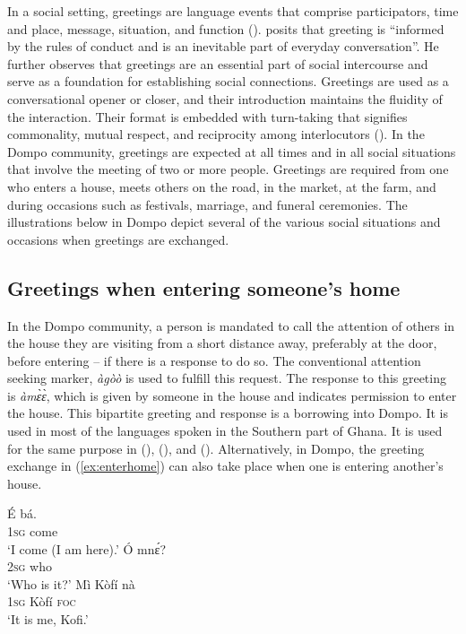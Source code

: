 \documentclass[output=paper,colorlinks,citecolor=brown]{langscibook}
\begin{document}
In a social setting, greetings are language events that comprise participators, time and place, message, situation, and function (\cite[14]{Egblewogbe1990}). \citet[1]{Akindele1990} posits that greeting is “informed by the rules of conduct and is an inevitable part of everyday conversation”. He further observes that greetings are an essential part of social intercourse and serve as a foundation for establishing social connections. Greetings are used as a conversational opener or closer, and their introduction maintains the fluidity of the interaction. Their format is embedded with turn-taking that signifies commonality, mutual respect, and reciprocity among interlocutors (\cite{Agyekum2008, Duranti1997}). In the Dompo community, greetings are expected at all times and in all social situations that involve the meeting of two or more people. Greetings are required from one who enters a house, meets others on the road, in the market, at the farm, and during occasions such as festivals, marriage, and funeral ceremonies. The illustrations below in Dompo depict several of the various social situations and occasions when greetings are exchanged. 

\subsection{Greetings when entering someone's home}

In the Dompo community, a person is mandated to call the attention of others in the house they are visiting from a short distance away, preferably at the door, before entering -- if there is a response to do so. The conventional attention seeking marker, \textit{àgòò} is used to fulfill this request. The response to this greeting is \textit{àmɛ̀ɛ̀}, which is given by someone in the house and indicates permission to enter the house. This bipartite greeting and response is a borrowing into Dompo. It is used in most of the languages spoken in the Southern part of Ghana. It is used for the same purpose in  (\cite{BerryKotei69}),  (\cite{Ameka2009}), and  (\cite{Ofori2011}). Alternatively, in Dompo, the greeting exchange in (\ref{ex:enterhome}) can also take place when one is entering another’s house. 

\ea \label{ex:enterhome}
\begin{xlist}
\ex 
    \gll É	bá.\\
			\textsc{1sg}	come \\
	\glt	‘I come (I am here).’
\ex
   \gll  Ó	mnɛ́?\\
			\textsc{2sg}	who\\
		\glt ‘Who is it?’
\ex
   \gll Mì	Kòfí	nà \\
			\textsc{1sg}	Kòfí	\textsc{foc}		\\
	\glt		‘It is me, Kofi.’
\end{xlist}
\z
\end{document}

